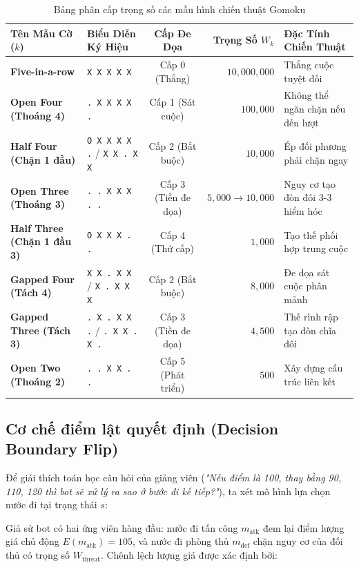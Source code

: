\documentclass[11pt,a4paper]{article}
\begin{document}
\begin{table}[htbp]
\centering
\small
\caption{Bảng phân cấp trọng số các mẫu hình chiến thuật Gomoku}
\label{tab:pattern_weights}
\begin{tabularx}{\textwidth}{l p{2.8cm} c r X}
\toprule
\textbf{Tên Mẫu Cờ ($k$)} & \textbf{Biểu Diễn Ký Hiệu} & \textbf{Cấp Đe Dọa} & \textbf{Trọng Số $W_k$} & \textbf{Đặc Tính Chiến Thuật} \\
\midrule
\textbf{Five-in-a-row} & \texttt{X X X X X} & Cấp 0 (Thắng) & $10{,}000{,}000$ & Thắng cuộc tuyệt đối \\
\textbf{Open Four (Thoáng 4)} & \texttt{. X X X X .} & Cấp 1 (Sát cuộc) & $100{,}000$ & Không thể ngăn chặn nếu đến lượt \\
\textbf{Half Four (Chặn 1 đầu)} & \texttt{O X X X X .} / \texttt{X X . X X} & Cấp 2 (Bắt buộc) & $10{,}000$ & Ép đối phương phải chặn ngay \\
\textbf{Open Three (Thoáng 3)} & \texttt{. . X X X . .} & Cấp 3 (Tiền đe dọa) & $5{,}000 \to 10{,}000$ & Nguy cơ tạo đòn đôi 3-3 hiểm hóc \\
\textbf{Half Three (Chặn 1 đầu 3)} & \texttt{O X X X . .} & Cấp 4 (Thứ cấp) & $1{,}000$ & Tạo thế phối hợp trung cuộc \\
\textbf{Gapped Four (Tách 4)} & \texttt{X X . X X} / \texttt{X . X X X} & Cấp 2 (Bắt buộc) & $8{,}000$ & Đe dọa sát cuộc phân mảnh \\
\textbf{Gapped Three (Tách 3)} & \texttt{. X . X X .} / \texttt{. X X . X .} & Cấp 3 (Tiền đe dọa) & $4{,}500$ & Thế rình rập tạo đòn chĩa đôi \\
\textbf{Open Two (Thoáng 2)} & \texttt{. . X X . .} & Cấp 5 (Phát triển) & $500$ & Xây dựng cấu trúc liên kết \\
\bottomrule
\end{tabularx}
\end{table}

\subsection{Cơ chế điểm lật quyết định (Decision Boundary Flip)}
Để giải thích toán học câu hỏi của giảng viên (\textit{"Nếu điểm là 100, thay bằng 90, 110, 120 thì bot sẽ xử lý ra sao ở bước đi kế tiếp?"}), ta xét mô hình lựa chọn nước đi tại trạng thái $s$:

Giả sử bot có hai ứng viên hàng đầu: nước đi tấn công $m_{\text{atk}}$ đem lại điểm lượng giá chủ động $E(m_{\text{atk}}) = 105$, và nước đi phòng thủ $m_{\text{def}}$ chặn nguy cơ của đối thủ có trọng số $W_{\text{threat}}$. Chênh lệch lượng giá được xác định bởi:
\end{document}
